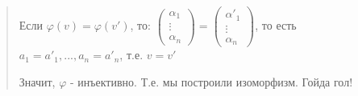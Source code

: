\documentclass{article}
\begin{document}
\begin{quote}
    Если $\varphi (v) = \varphi (v')$, то:  $\begin{pmatrix}
        \alpha_1 \\ \vdots \\ \alpha_n
    \end{pmatrix} = 
        \begin{pmatrix}
        \alpha'_1 \\ \vdots \\ \alpha_n
    \end{pmatrix}$, то есть $a_1 = a'_1, ..., a_n = a'_n$, т.е. $v = v'$

    Значит, $\varphi$ - инъективно. Т.е. мы построили изоморфизм. Гойда гол!
\end{quote}
\end{document}
